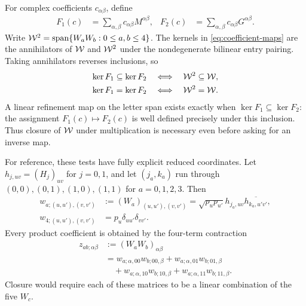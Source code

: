 For complex coefficients $c_{\alpha\beta}$, define
\begin{align}
	F_1(c) & =\sum_{\alpha,\beta}c_{\alpha\beta}M^{\alpha\beta},
	       &
	F_2(c) & =\sum_{\alpha,\beta}c_{\alpha\beta}G^{\alpha\beta}.
	\label{eq:coefficient-maps}
\end{align}
Write
$\mathcal{W}^2=\operatorname{span}\{W_aW_b:0\leq a,b\leq4\}$.
The kernels in \cref{eq:coefficient-maps} are the annihilators of
$\mathcal{W}$ and $\mathcal{W}^2$ under the nondegenerate bilinear entry pairing.
Taking annihilators reverses inclusions, so
\begin{align}
	\ker F_1\subseteq\ker F_2
	 & \quad\Longleftrightarrow\quad
	\mathcal{W}^2\subseteq\mathcal{W},
	\nonumber                        \\
	\ker F_1=\ker F_2
	 & \quad\Longleftrightarrow\quad
	\mathcal{W}^2=\mathcal{W}.
	\label{eq:kernel-criterion}
\end{align}
A linear refinement map on the letter span exists exactly when
$\ker F_1\subseteq\ker F_2$: the assignment
$F_1(c)\mapsto F_2(c)$ is well defined precisely under this inclusion.
Thus closure of $\mathcal{W}$ under multiplication is necessary even
before asking for an inverse map.

For reference, these tests have fully explicit reduced coordinates.
Let $h_{j,uv}=(H_j)_{uv}$ for $j=0,1$, and let
$(j_a,k_a)$ run through $(0,0),(0,1),(1,0),(1,1)$ for $a=0,1,2,3$.
Then
\begin{align}
	w_{a;(u,u'),(v,v')}
	 & :=(W_a)_{(u,u'),(v,v')}
	=\sqrt{p_up_{u'}}
	h_{j_a,uv}\overline{h_{k_a,u'v'}},
	\nonumber                        \\
	w_{4;(u,u'),(v,v')}
	 & =p_u\delta_{uu'}\delta_{vv'}.
	\label{eq:entry-coordinates}
\end{align}
Every product coefficient is obtained by the four-term contraction
\begin{align}
	z_{ab;\alpha\beta}
	 & :=(W_aW_b)_{\alpha\beta}
	\nonumber                              \\
	 & =w_{a;\alpha,00}w_{b;00,\beta}
	+w_{a;\alpha,01}w_{b;01,\beta}
	\nonumber                              \\
	 & \quad+w_{a;\alpha,10}w_{b;10,\beta}
	+w_{a;\alpha,11}w_{b;11,\beta}.
	\label{eq:product-entries}
\end{align}
Closure would require each of these matrices to be a linear
combination of the five $W_c$.

